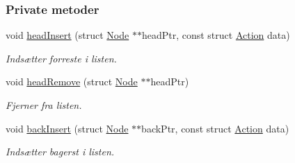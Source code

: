 \subsubsection*{Private metoder}
\begin{DoxyCompactItemize}
\item 
void \hyperlink{class_queue_a1189c09234d75518492525645a05db07}{head\+Insert} (struct \hyperlink{queue_8c_db/d8b/struct_node}{Node} $\ast$$\ast$head\+Ptr, const struct \hyperlink{queue_8h_df/d8c/struct_action}{Action} data)
\begin{DoxyCompactList}\small\item\em Indsætter forreste i listen. \end{DoxyCompactList}\item 
void \hyperlink{class_queue_ae54666c891fd21d5497f48c385a00b74}{head\+Remove} (struct \hyperlink{queue_8c_db/d8b/struct_node}{Node} $\ast$$\ast$head\+Ptr)
\begin{DoxyCompactList}\small\item\em Fjerner fra listen. \end{DoxyCompactList}\item 
void \hyperlink{class_queue_a5a25a737ba7dff74923f5cb04e19164c}{back\+Insert} (struct \hyperlink{queue_8c_db/d8b/struct_node}{Node} $\ast$$\ast$back\+Ptr, const struct \hyperlink{queue_8h_df/d8c/struct_action}{Action} data)
\begin{DoxyCompactList}\small\item\em Indsætter bagerst i listen. \end{DoxyCompactList}\end{DoxyCompactItemize}
